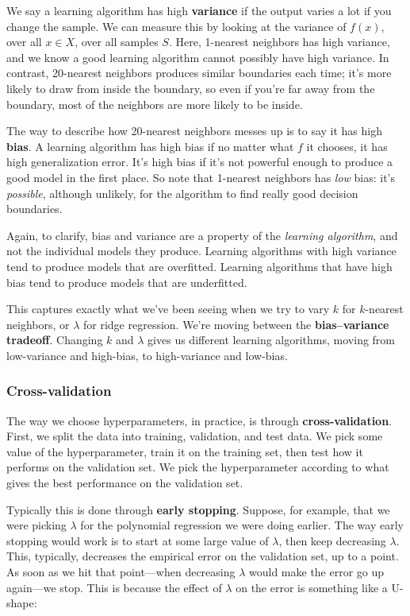 \documentclass[11pt,paper=letter]{scrartcl}
\begin{document}
We say a learning algorithm has high \textbf{variance} if the output varies a lot if you change the sample. We can measure this by looking at the variance of $f(x)$, over all $x \in X$, over all samples $S$. Here, 1-nearest neighbors has high variance, and we know a good learning algorithm cannot possibly have high variance. In contrast, 20-nearest neighbors produces similar boundaries each time; it's more likely to draw from inside the boundary, so even if you're far away from the boundary, most of the neighbors are more likely to be inside.

The way to describe how 20-nearest neighbors messes up is to say it has high \textbf{bias}. A learning algorithm has high bias if no matter what $f$ it chooses, it has high generalization error. It's high bias if it's not powerful enough to produce a good model in the first place. So note that 1-nearest neighbors has \textit{low} bias: it's \textit{possible}, although unlikely, for the algorithm to find really good decision boundaries.

Again, to clarify, bias and variance are a property of the \textit{learning algorithm}, and not the individual models they produce. Learning algorithms with high variance tend to produce models that are overfitted. Learning algorithms that have high bias tend to produce models that are underfitted.

This captures exactly what we've been seeing when we try to vary $k$ for $k$-nearest neighbors, or $\lambda$ for ridge regression. We're moving between the \textbf{bias--variance tradeoff}. Changing $k$ and $\lambda$ gives us different learning algorithms, moving from low-variance and high-bias, to high-variance and low-bias.

\subsubsection*{Cross-validation}

The way we choose hyperparameters, in practice, is through \textbf{cross-validation}. First, we split the data into training, validation, and test data. We pick some value of the hyperparameter, train it on the training set, then test how it performs on the validation set. We pick the hyperparameter according to what gives the best performance on the validation set.

Typically this is done through \textbf{early stopping}. Suppose, for example, that we were picking $\lambda$ for the polynomial regression we were doing earlier. The way early stopping would work is to start at some large value of $\lambda$, then keep decreasing $\lambda$. This, typically, decreases the empirical error on the validation set, up to a point. As soon as we hit that point---when decreasing $\lambda$ would make the error go up again---we stop. This is because the effect of $\lambda$ on the error is something like a U-shape:
\end{document}

